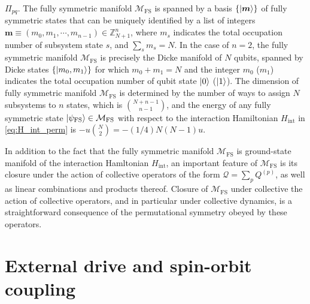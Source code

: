 \documentclass[nofootinbib,notitlepage,11pt]{revtex4-2}
\renewcommand{\t}{\text} %
\newcommand{\p}[1]{\left(#1\right)} %
\renewcommand{\set}[1]{\left\{#1\right\}} %
\renewcommand{\v}{\bm} %
\newcommand{\1}{\mathds{1}}
\newcommand{\M}{\mathcal{M}}
\newcommand{\Q}{\mathcal{Q}}
\newcommand{\ZZ}{\mathbb{Z}}
\newcommand{\FS}{\text{FS}}
\begin{document}
$\Pi_{pq}$.  The fully symmetric manifold $\M_\FS$ is spanned by a
basis $\set{\ket{\v m}}$ of fully symmetric states that can be
uniquely identified by a list of integers
$\v m\equiv\p{m_0,m_1,\cdots,m_{n-1}}\in\ZZ_{N+1}^n$, where $m_s$
indicates the total occupation number of subsystem state $s$, and
$\sum_sm_s=N$.  In the case of $n=2$, the fully symmetric manifold
$\M_\FS$ is precisely the Dicke manifold\cite{dicke1954coherence} of
$N$ qubits, spanned by Dicke states $\set{\ket{m_0,m_1}}$ for which
$m_0+m_1=N$ and the integer $m_0$ ($m_1$) indicates the total
occupation number of qubit state $\ket{0}$ ($\ket{1}$).  The dimension
of fully symmetric manifold $\M_\FS$ is determined by the number of
ways to assign $N$ subsystems to $n$ states, which is
${N+n-1 \choose n-1}$, and the energy of any fully symmetric state
$\ket{\psi_\FS}\in\M_\FS$ with respect to the interaction Hamiltonian
$H_{\t{int}}$ in \eqref{eq:H_int_perm} is
$-u{N \choose 2}=-\p{1/4}N\p{N-1}u$.

In addition to the fact that the fully symmetric manifold $\M_\FS$ is
ground-state manifold of the interaction Hamltonian $H_{\t{int}}$, an
important feature of $\M_\FS$ is its closure under the action of
collective operators of the form $\Q=\sum_pQ^{(p)}$, as well as linear
combinations and products thereof.  Closure of $\M_\FS$ under
collective the action of collective operators, and in particular under
collective dynamics, is a straightforward consequence of the
permutational symmetry obeyed by these operators.

\section{External drive and spin-orbit coupling}
\label{sec:drive_SOC}
\end{document}
